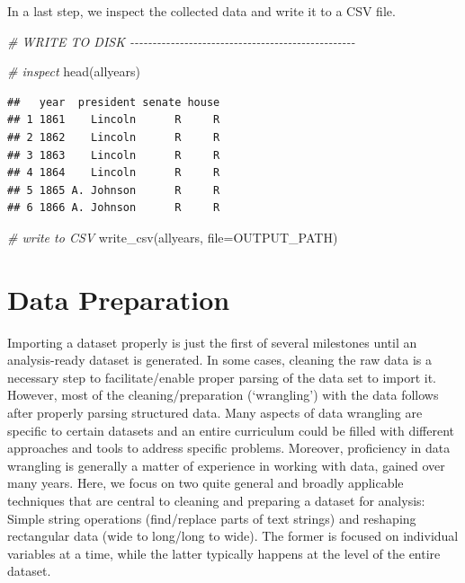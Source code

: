 \documentclass[
  12pt,
]{style/krantz}
\newenvironment{Shaded}{\begin{snugshade}}{\end{snugshade}}
\newcommand{\AttributeTok}[1]{\textcolor[rgb]{0.77,0.63,0.00}{#1}}
\newcommand{\CommentTok}[1]{\textcolor[rgb]{0.56,0.35,0.01}{\textit{#1}}}
\newcommand{\FunctionTok}[1]{\textcolor[rgb]{0.00,0.00,0.00}{#1}}
\newcommand{\NormalTok}[1]{#1}
\begin{document}
In a last step, we inspect the collected data and write it to a CSV file.

\begin{Shaded}
\begin{Highlighting}[]
\CommentTok{\# WRITE TO DISK {-}{-}{-}{-}{-}{-}{-}{-}{-}{-}{-}{-}{-}{-}{-}{-}{-}{-}{-}{-}{-}{-}{-}{-}{-}{-}{-}{-}{-}{-}{-}{-}{-}{-}{-}{-}{-}{-}{-}{-}{-}{-}{-}{-}{-}{-}{-}{-}{-}{-}}

\CommentTok{\# inspect}
\FunctionTok{head}\NormalTok{(allyears)}
\end{Highlighting}
\end{Shaded}

\begin{verbatim}
##   year  president senate house
## 1 1861    Lincoln      R     R
## 2 1862    Lincoln      R     R
## 3 1863    Lincoln      R     R
## 4 1864    Lincoln      R     R
## 5 1865 A. Johnson      R     R
## 6 1866 A. Johnson      R     R
\end{verbatim}

\begin{Shaded}
\begin{Highlighting}[]
\CommentTok{\# write to CSV}
\FunctionTok{write\_csv}\NormalTok{(allyears, }\AttributeTok{file=}\NormalTok{OUTPUT\_PATH)}
\end{Highlighting}
\end{Shaded}

\hypertarget{data-preparation}{%
\chapter{Data Preparation}\label{data-preparation}}

Importing a dataset properly is just the first of several milestones until an analysis-ready dataset is generated. In some cases, cleaning the raw data is a necessary step to facilitate/enable proper parsing of the data set to import it. However, most of the cleaning/preparation (`wrangling') with the data follows after properly parsing structured data. Many aspects of data wrangling are specific to certain datasets and an entire curriculum could be filled with different approaches and tools to address specific problems. Moreover, proficiency in data wrangling is generally a matter of experience in working with data, gained over many years. Here, we focus on two quite general and broadly applicable techniques that are central to cleaning and preparing a dataset for analysis: Simple string operations (find/replace parts of text strings) and reshaping rectangular data (wide to long/long to wide). The former is focused on individual variables at a time, while the latter typically happens at the level of the entire dataset.
\end{document}

